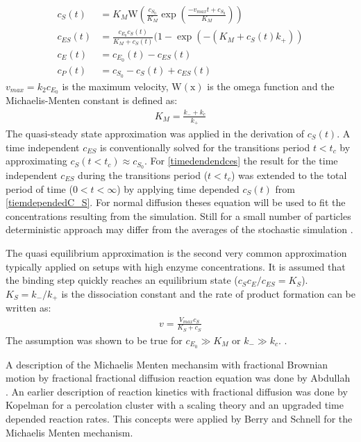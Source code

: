 \documentclass[
  a4paper,BCOR10mm,oneside,
  headsepline,footsepline,%
  fleqn,openbib
]{scrbook}
\begin{document}
\begin{align}
 c_S(t)&=K_M \mathrm{W}\left(\frac{c_{S_0}}{K_M} \exp \left( \frac{-v_{max} t + c_{S_0}}{K_M}\right)\right)  \label{tiemdependedC_S} \\
 c_{ES}(t)&= \frac{c_{E_0} c_S(t)}{K_M+c_S(t)} (1- \exp(-(K_M + c_S(t) k_+))\label{timedendendces}\\ 
 c_{E}(t)&=c_{E_0}(t)-c_{ES}(t) \label{timedendendce}\\
 c_{P}(t)&=c_{S_0}-c_S(t)+c_{ES}(t) \label{timedendendcp}
\end{align}
$v_{max}=k_2 c_{E_0}$ is the maximum velocity,  $\mathrm{W(x)}$ is the omega function and the Michaelis-Menten constant is defined as:
\begin{align}
 K_M= \frac{k_{-}+k_c}{k_+}
\end{align}
The quasi-steady state approximation was applied in the derivation of $c_S(t)$. A time independent $c_{ES}$ is conventionally solved for the transitions period $t<t_c$ by approximating $c_S(t<t_c) \approx c_{S_0}$. For \cref{timedendendces} the result for the time independent $c_{ES}$ during the transitions period ($t<t_c$) was extended to the total period of time ($0<t<\infty$) by applying time depended $c_S(t)$ from \cref{tiemdependedC_S}. For normal diffusion theses equation will be used to fit the concentrations resulting from the simulation.  Still for a small number of particles deterministic approach may differ from the averages of the stochastic simulation \cite{Turner2004}.\par
The quasi equilibrium approximation is the second very common approximation typically applied on setups with high enzyme concentrations. It is assumed that the binding step quickly reaches an equilibrium state ($c_S c_E/c_{ES}=K_S$). $K_S=k_-/k_+$ is the dissociation constant and the rate of product formation can be written as:
\begin{align}
 v={\frac{V_{max} c_S}{K_S+ c_S}}
\end{align}
The assumption was shown to be true for $c_{E_0}\gg K_M \text{ or } k_- \gg k_c$.  \cite{Palsson1987}.\par A description of the Michaelis Menten mechansim with fractional Brownian motion by fractional fractional diffusion reaction equation \cite{Yuste2002} was done by Abdullah \cite{AiniAbdullah2011}. An earlier description of reaction kinetics with fractional diffusion was done by Kopelman \cite{Kopelman1988} for a percolation cluster with a scaling theory and an upgraded time depended reaction rates. This concepts were applied by Berry \cite{Berry2002} and Schnell \cite{Schnell2004} for the Michaelis Menten mechanism.
\end{document}
